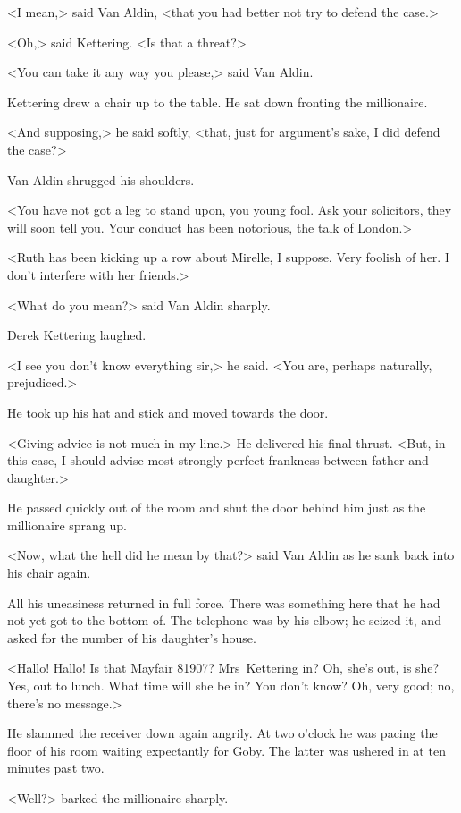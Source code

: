 <I mean,> said Van Aldin, <that you had better not try to defend the case.>

<Oh,> said Kettering. <Is that a threat?>

<You can take it any way you please,> said Van Aldin.

Kettering drew a chair up to the table. He sat down fronting the millionaire.

<And supposing,> he said softly, <that, just for argument's sake, I did defend the case?>

Van Aldin shrugged his shoulders.

<You have not got a leg to stand upon, you young fool. Ask your solicitors, they will soon tell you. Your conduct has been notorious, the talk of London.>

<Ruth has been kicking up a row about Mirelle, I suppose. Very foolish of her. I don't interfere with her friends.>

<What do you mean?> said Van Aldin sharply.

Derek Kettering laughed.

<I see you don't know everything sir,> he said. <You are, perhaps naturally, prejudiced.>

He took up his hat and stick and moved towards the door.

<Giving advice is not much in my line.> He delivered his final thrust. <But, in this case, I should advise most strongly perfect frankness between father and daughter.>

He passed quickly out of the room and shut the door behind him just as the millionaire sprang up.

<Now, what the hell did he mean by that?> said Van Aldin as he sank back into his chair again.

All his uneasiness returned in full force. There was something here that he had not yet got to the bottom of. The telephone was by his elbow; he seized it, and asked for the number of his daughter's house.

<Hallo! Hallo! Is that Mayfair 81907? Mrs~Kettering in? Oh, she's out, is she? Yes, out to lunch. What time will she be in? You don't know? Oh, very good; no, there's no message.>

He slammed the receiver down again angrily. At two o'clock he was pacing the floor of his room waiting expectantly for Goby. The latter was ushered in at ten minutes past two.

<Well?> barked the millionaire sharply.

